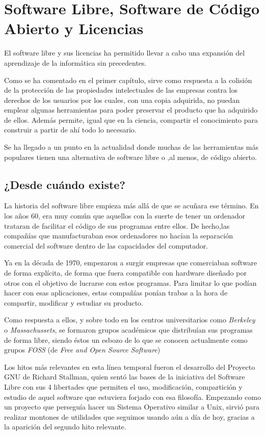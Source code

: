 \section{Software Libre, Software de Código Abierto y Licencias}
El software libre y sus licencias \cite{gplv3} ha permitido llevar a cabo una expansión del aprendizaje de la informática sin precedentes. 

Como se ha comentado en el primer capítulo, sirve como respuesta a la colisión de la protección de las propiedades intelectuales de las empresas contra los derechos de los usuarios por los cuales, con una copia adquirida, no puedan emplear algunas herramientas para poder preservar el producto que ha adquirido de ellos. Además permite, igual que en la ciencia, compartir el conocimiento para construir a partir de ahí todo lo necesario.

Se ha llegado a un punto en la actualidad donde muchas de las herramientas más populares tienen una alternativa de software libre o ,al menos, de código abierto.

\subsection{¿Desde cuándo existe?}
La historia del software libre empieza más allá de que se acuñara ese término. En los años 60, era muy común que aquellos con la suerte de tener un ordenador trataran de facilitar el código de sus programas entre ellos. De hecho,las compañías que manufacturaban esos ordenadores no hacían la separación comercial del software dentro de las capacidades del computador.

Ya en la década de 1970, empezaron a surgir empresas que comerciaban software de forma explícita, de forma que fuera compatible con hardware diseñado por otros con el objetivo de lucrarse con estos programas. Para limitar lo que podían hacer con esas aplicaciones, estas compañías ponían trabas a la hora de compartir, modificar y estudiar su producto.

Como respuesta a ellos, y sobre todo en los centros universitarios como \textit{Berkeley} o \textit{Massachussets}, se formaron grupos académicos que distribuían sus programas de forma libre, siendo éstos un esbozo de lo que se conocen actualmente como grupos \textit{FOSS} (de \textit{Free and Open Source Software}) 

Los hitos más relevantes en esta línea temporal fueron el desarrollo del Proyecto GNU de Richard Stallman, quien  sentó las bases de la iniciativa del Software Libre con sus 4 libertades que permiten el uso, modificación, compartición y estudio de aquel software que estuviera forjado con esa filosofía. Empezando como un proyecto que perseguía hacer un Sistema Operativo similar a Unix, sirvió para realizar montones de utilidades que seguimos usando aún a día de hoy, gracias a la aparición del segundo hito relevante.


